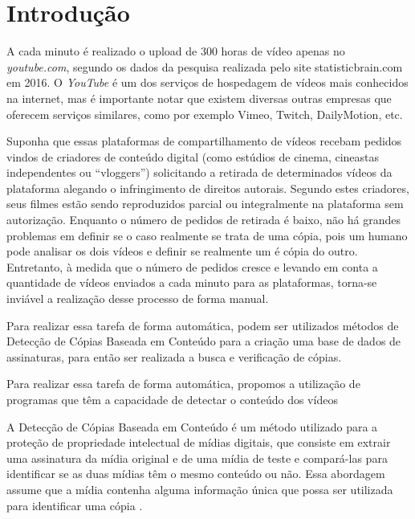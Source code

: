 \chapter{Introdução}
\label{chap:introducao}

A cada minuto é realizado o upload de 300 horas de vídeo apenas no \textit{youtube.com}, segundo os dados da pesquisa realizada pelo site statisticbrain.com em 2016. O \textit{YouTube} é um dos serviços de hospedagem de vídeos mais conhecidos na internet, mas é importante notar que existem diversas outras empresas que oferecem serviços similares, como por exemplo Vimeo, Twitch, DailyMotion, etc.

Suponha que essas plataformas de compartilhamento de vídeos recebam pedidos vindos de criadores de conteúdo digital (como estúdios de cinema, cineastas independentes ou ``vloggers'') solicitando a retirada de determinados vídeos da plataforma alegando o infringimento de direitos autorais. Segundo estes criadores, seus filmes estão sendo reproduzidos parcial ou integralmente na plataforma sem autorização. Enquanto o número de pedidos de retirada é baixo, não há grandes problemas em definir se o caso realmente se trata de uma cópia, pois um humano pode analisar os dois vídeos e definir se realmente um é cópia do outro. Entretanto, à medida que o número de pedidos cresce e levando em conta a quantidade de vídeos enviados a cada minuto para as plataformas, torna-se  inviável a realização desse processo de forma manual. 

Para realizar essa tarefa de forma automática, podem ser utilizados métodos de Detecção de Cópias Baseada em Conteúdo para a criação uma base de dados de assinaturas, para então ser realizada a busca e verificação de cópias.

Para realizar essa tarefa de forma automática, propomos a utilização de programas que têm a capacidade de detectar o conteúdo dos vídeos

A Detecção de Cópias Baseada em Conteúdo é um método utilizado para a proteção de propriedade intelectual de mídias digitais, que consiste em extrair uma assinatura da mídia original e de uma mídia de teste e compará-las para identificar se as duas mídias têm o mesmo conteúdo ou não. Essa abordagem assume que a mídia contenha alguma informação única que possa ser utilizada para identificar uma cópia \citeauthor{kim2005spatiotemporal}. 




